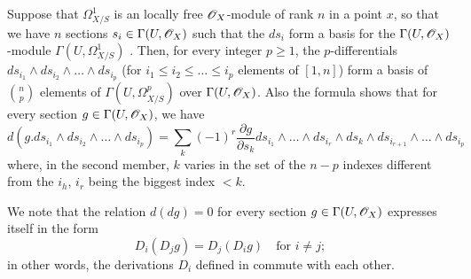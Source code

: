 \begin{env}[16.6.5]
\label{IV.16.6.5}
Suppose that $\Omega_{X/S}^1$ is an locally free $\mathscr{O}_X$-module of rank $n$ in a point $x$, so that we have $n$ sections $s_i \in \Gamma(U, \mathscr{O}_X)$ such that the $ds_i$ form a basis for the $\Gamma(U, \mathscr{O}_X)$-module $\Gamma(U, \Omega_{X/S}^1)$ .
Then, for every integer $p \geq 1$, the $p$-differentials $ds_{i_1} \wedge ds_{i_2} \wedge \dots \wedge ds_{i_p}$ (for $i_1 \leq i_2 \leq \dots \leq i_p$ elements of $[1,n]$) form a basis of $\binom{n}{p}$ elements of $\Gamma(U, \Omega_{X/S}^p)$ over $\Gamma(U, \mathscr{O}_X)$.
Also the formula  shows that for every section $g \in \Gamma(U, \mathscr{O}_X)$, we have
\[
  \label{IV.16.6.5.1}
  d(g.ds_{i_1} \wedge ds_{i_2} \wedge \dots \wedge ds_{i_p}) = \sum_k (-1)^r \frac{\partial g}{\partial s_k} ds_{i_1} \wedge \dots \wedge ds_{i_r} \wedge ds_k \wedge ds_{i_{r+1}} \wedge \dots \wedge ds_{i_p}
  \tag{16.6.5.1}
\]
where, in the second member, $k$ varies in the set of the $n - p$ indexes different from the $i_h$, $i_r$ being the biggest index $<k$.

We note that the relation $d(dg) = 0$ for every section $g \in \Gamma(U, \mathscr{O}_X)$ expresses itself in the form
\[
  D_i(D_j g) = D_j(D_i g) \quad \text{for $i \neq j$};
\]
in other words, the derivations $D_i$ defined in  commute with each other.
\end{env}